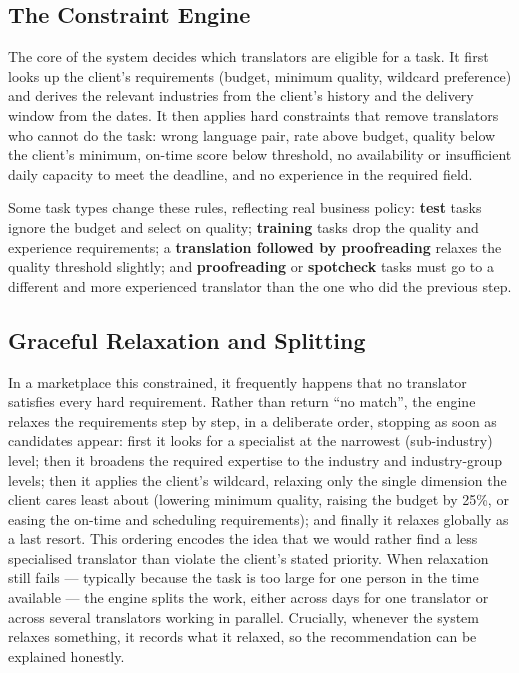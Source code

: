 \documentclass[9pt,a4paper,twoside]{utils/tau-class/tau}
\begin{document}
\subsection{The Constraint Engine}

The core of the system decides which translators are eligible for a task. It first looks up the client's requirements (budget, minimum quality, wildcard preference) and derives the relevant industries from the client's history and the delivery window from the dates. It then applies hard constraints that remove translators who cannot do the task: wrong language pair, rate above budget, quality below the client's minimum, on-time score below threshold, no availability or insufficient daily capacity to meet the deadline, and no experience in the required field.

Some task types change these rules, reflecting real business policy: \textbf{test} tasks ignore the budget and select on quality; \textbf{training} tasks drop the quality and experience requirements; a \textbf{translation followed by proofreading} relaxes the quality threshold slightly; and \textbf{proofreading} or \textbf{spotcheck} tasks must go to a different and more experienced translator than the one who did the previous step.

\subsection{Graceful Relaxation and Splitting}

In a marketplace this constrained, it frequently happens that no translator satisfies every hard requirement. Rather than return ``no match'', the engine relaxes the requirements step by step, in a deliberate order, stopping as soon as candidates appear: first it looks for a specialist at the narrowest (sub-industry) level; then it broadens the required expertise to the industry and industry-group levels; then it applies the client's wildcard, relaxing only the single dimension the client cares least about (lowering minimum quality, raising the budget by 25\%, or easing the on-time and scheduling requirements); and finally it relaxes globally as a last resort. This ordering encodes the idea that we would rather find a less specialised translator than violate the client's stated priority. When relaxation still fails --- typically because the task is too large for one person in the time available --- the engine splits the work, either across days for one translator or across several translators working in parallel. Crucially, whenever the system relaxes something, it records what it relaxed, so the recommendation can be explained honestly.
\end{document}
